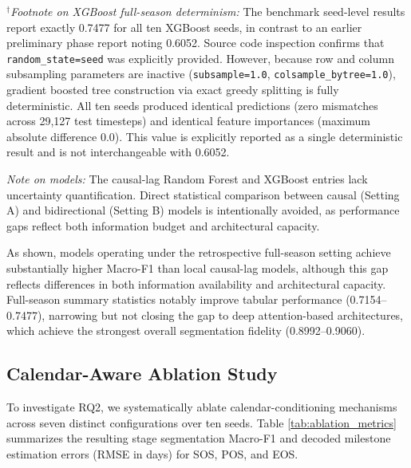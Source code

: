 \documentclass[runningheads]{llncs}
\begin{document}
\noindent \textit{$^\dagger$Footnote on XGBoost full-season determinism:} The benchmark seed-level results report exactly 0.7477 for all ten XGBoost seeds, in contrast to an earlier preliminary phase report noting 0.6052. Source code inspection confirms that \texttt{random\_state=seed} was explicitly provided. However, because row and column subsampling parameters are inactive (\texttt{subsample=1.0}, \texttt{colsample\_bytree=1.0}), gradient boosted tree construction via exact greedy splitting is fully deterministic. All ten seeds produced identical predictions (zero mismatches across 29,127 test timesteps) and identical feature importances (maximum absolute difference 0.0). This value is explicitly reported as a single deterministic result and is not interchangeable with 0.6052.

\noindent \textit{Note on models:} The causal-lag Random Forest and XGBoost entries lack uncertainty quantification. Direct statistical comparison between causal (Setting A) and bidirectional (Setting B) models is intentionally avoided, as performance gaps reflect both information budget and architectural capacity.

As shown, models operating under the retrospective full-season setting achieve substantially higher Macro-F1 than local causal-lag models, although this gap reflects differences in both information availability and architectural capacity. Full-season summary statistics notably improve tabular performance (0.7154--0.7477), narrowing but not closing the gap to deep attention-based architectures, which achieve the strongest overall segmentation fidelity (0.8992--0.9060).

\subsection{Calendar-Aware Ablation Study}
To investigate RQ2, we systematically ablate calendar-conditioning mechanisms across seven distinct configurations over ten seeds. Table \ref{tab:ablation_metrics} summarizes the resulting stage segmentation Macro-F1 and decoded milestone estimation errors (RMSE in days) for SOS, POS, and EOS.
\end{document}
